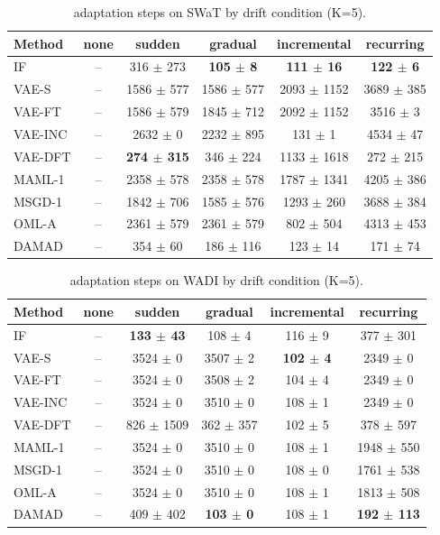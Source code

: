 \begin{table}[t]
\centering
\small
\caption{adaptation steps on SWaT by drift condition (K=5).}
\label{tab:drift_adaptation_steps_swat}
\begin{tabular}{lccccc}
\toprule
Method & none & sudden & gradual & incremental & recurring \\
\midrule
IF & – & 316 $\pm$ 273 & \textbf{105 $\pm$ 8} & \textbf{111 $\pm$ 16} & \textbf{122 $\pm$ 6} \\
VAE-S & – & 1586 $\pm$ 577 & 1586 $\pm$ 577 & 2093 $\pm$ 1152 & 3689 $\pm$ 385 \\
VAE-FT & – & 1586 $\pm$ 579 & 1845 $\pm$ 712 & 2092 $\pm$ 1152 & 3516 $\pm$ 3 \\
VAE-INC & – & 2632 $\pm$ 0 & 2232 $\pm$ 895 & 131 $\pm$ 1 & 4534 $\pm$ 47 \\
VAE-DFT & – & \textbf{274 $\pm$ 315} & 346 $\pm$ 224 & 1133 $\pm$ 1618 & 272 $\pm$ 215 \\
MAML-1 & – & 2358 $\pm$ 578 & 2358 $\pm$ 578 & 1787 $\pm$ 1341 & 4205 $\pm$ 386 \\
MSGD-1 & – & 1842 $\pm$ 706 & 1585 $\pm$ 576 & 1293 $\pm$ 260 & 3688 $\pm$ 384 \\
OML-A & – & 2361 $\pm$ 579 & 2361 $\pm$ 579 & 802 $\pm$ 504 & 4313 $\pm$ 453 \\
DAMAD & – & 354 $\pm$ 60 & 186 $\pm$ 116 & 123 $\pm$ 14 & 171 $\pm$ 74 \\
\bottomrule
\end{tabular}
\end{table}

\begin{table}[t]
\centering
\small
\caption{adaptation steps on WADI by drift condition (K=5).}
\label{tab:drift_adaptation_steps_wadi}
\begin{tabular}{lccccc}
\toprule
Method & none & sudden & gradual & incremental & recurring \\
\midrule
IF & – & \textbf{133 $\pm$ 43} & 108 $\pm$ 4 & 116 $\pm$ 9 & 377 $\pm$ 301 \\
VAE-S & – & 3524 $\pm$ 0 & 3507 $\pm$ 2 & \textbf{102 $\pm$ 4} & 2349 $\pm$ 0 \\
VAE-FT & – & 3524 $\pm$ 0 & 3508 $\pm$ 2 & 104 $\pm$ 4 & 2349 $\pm$ 0 \\
VAE-INC & – & 3524 $\pm$ 0 & 3510 $\pm$ 0 & 108 $\pm$ 1 & 2349 $\pm$ 0 \\
VAE-DFT & – & 826 $\pm$ 1509 & 362 $\pm$ 357 & 102 $\pm$ 5 & 378 $\pm$ 597 \\
MAML-1 & – & 3524 $\pm$ 0 & 3510 $\pm$ 0 & 108 $\pm$ 1 & 1948 $\pm$ 550 \\
MSGD-1 & – & 3524 $\pm$ 0 & 3510 $\pm$ 0 & 108 $\pm$ 0 & 1761 $\pm$ 538 \\
OML-A & – & 3524 $\pm$ 0 & 3510 $\pm$ 0 & 108 $\pm$ 1 & 1813 $\pm$ 508 \\
DAMAD & – & 409 $\pm$ 402 & \textbf{103 $\pm$ 0} & 108 $\pm$ 1 & \textbf{192 $\pm$ 113} \\
\bottomrule
\end{tabular}
\end{table}

